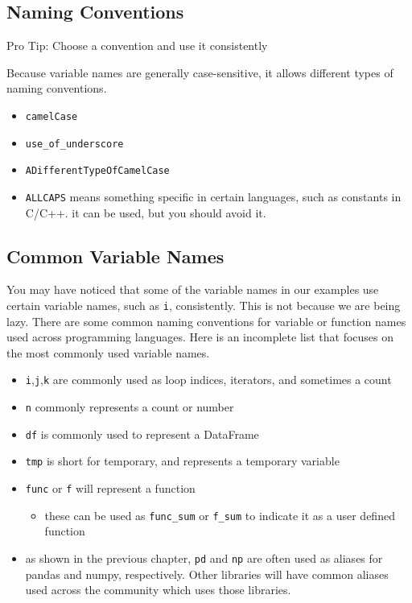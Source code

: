 \documentclass[
]{book}
\providecommand{\tightlist}{%
  \setlength{\itemsep}{0pt}\setlength{\parskip}{0pt}}
\begin{document}
\subsection{Naming Conventions}\label{naming-conventions}

Pro Tip: Choose a convention and use it consistently

Because variable names are generally case-sensitive, it allows different types of naming
conventions.

\begin{itemize}
\tightlist
\item
  \texttt{camelCase}
\item
  \texttt{use\_of\_underscore}
\item
  \texttt{ADifferentTypeOfCamelCase}
\item
  \texttt{ALLCAPS} means something specific in certain languages, such as constants in C/C++. it can be used, but you should avoid it.
\end{itemize}

\subsection{Common Variable Names}\label{common-variable-names}

You may have noticed that some of the variable names in our examples use certain
variable names, such as \texttt{i}, consistently. This is not because we are being
lazy. There are some common naming conventions for variable
or function names used across programming languages. Here is an incomplete list
that focuses on the most commonly used variable names.

\begin{itemize}
\tightlist
\item
  \texttt{i},\texttt{j},\texttt{k} are commonly used as loop indices, iterators, and sometimes a count
\item
  \texttt{n} commonly represents a count or number
\item
  \texttt{df} is commonly used to represent a DataFrame
\item
  \texttt{tmp} is short for temporary, and represents a temporary variable
\item
  \texttt{func} or \texttt{f} will represent a function

  \begin{itemize}
  \tightlist
  \item
    these can be used as \texttt{func\_sum} or \texttt{f\_sum} to indicate it as a user defined function
  \end{itemize}
\item
  as shown in the previous chapter, \texttt{pd} and \texttt{np} are often used as aliases for
  pandas and numpy, respectively. Other libraries will have common aliases used across
  the community which uses those libraries.
\end{itemize}
\end{document}

